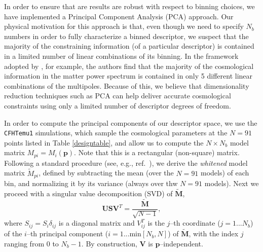 \documentclass[reprint,aps,prd,superscriptaddress,showkeys,showpacs]{revtex4-1}
\begin{document}
In order to ensure that are results are robust with respect to binning
choices, we have implemented a Principal Component Analysis (PCA)
approach. Our physical motivation for this approach is that, even
though we need to specify $N_b$ numbers in order to fully characterize
a binned descriptor, we suspect that the majority of the constraining
information (of a particular descriptor) is contained in a limited
number of linear combinations of its binning. In the framework adopted
by \citep{coyote2}, for example, the authors find that the majority of
the cosmological information in the matter power spectrum is contained
in only 5 different linear combinations of the multipoles. Because of
this, we believe that dimensionality reduction techniques such as PCA
can help deliver accurate cosmological constraints using only a
limited number of descriptor degrees of freedom.

In order to compute the principal components of our descriptor space,
we use the \texttt{CFHTemu1} simulations, which sample the
cosmological parameters at the $N=91$ points listed in Table
\ref{designtable}, and allow us to compute the $N\times N_b$ model
matrix $M_{pi}=M_i(\mathbf{p})$. Note that this is a rectangular
(non-square) matrix. Following a standard procedure (see, e.g.,
ref.~\citep{astroMLText}), we derive the {\it whitened} model matrix
$\tilde{M}_{pi}$, defined by subtracting the mean (over the $N=91$ models) of each bin,
and normalizing it by its variance (always over thw $N=91$ models). Next we proceed with a singular
value decomposition (SVD) of $\mathbf{\tilde{M}}$,
\begin{equation}
\label{svd}
\mathbf{U}\mathbf{S} \mathbf{V}^T=\frac{\mathbf{\tilde{M}}}{\sqrt{N-1}},
\end{equation}   
%
where $S_{ij}=S_i\delta_{ij}$ is a diagonal matrix and $V^T_{ij}$ is
the $j$--th coordinate ($j=1...N_b$) of the $i$--th principal
component ($i=1...\mathrm{min}[N_b,N]$) of $\mathbf{\tilde{M}}$, with
the index $j$ ranging from $0$ to $N_b-1$. By construction,
$\mathbf{V}$ is $\mathbf{p}$--independent.
\end{document}
